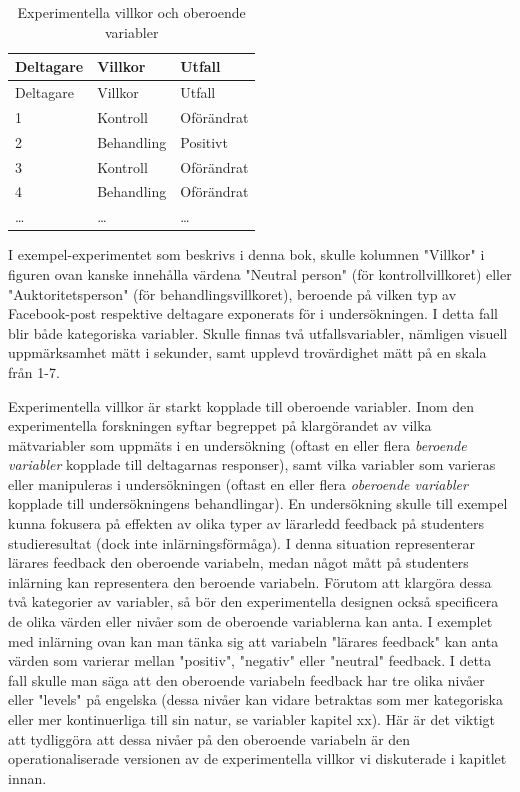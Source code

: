 \documentclass[
]{book}
\begin{document}
\begin{longtable}[]{@{}lll@{}}
\caption{Experimentella villkor och oberoende variabler}\tabularnewline
\toprule
Deltagare & Villkor & Utfall\tabularnewline
\midrule
\endfirsthead
\toprule
Deltagare & Villkor & Utfall\tabularnewline
\midrule
\endhead
1 & Kontroll & Oförändrat\tabularnewline
2 & Behandling & Positivt\tabularnewline
3 & Kontroll & Oförändrat\tabularnewline
4 & Behandling & Oförändrat\tabularnewline
\ldots{} & \ldots{} & \ldots{}\tabularnewline
\bottomrule
\end{longtable}

I exempel-experimentet som beskrivs i denna bok, skulle kolumnen "Villkor" i figuren ovan kanske innehålla värdena "Neutral person" (för kontrollvillkoret) eller "Auktoritetsperson" (för behandlingsvillkoret), beroende på vilken typ av Facebook-post respektive deltagare exponerats för i undersökningen. I detta fall blir både kategoriska variabler. Skulle finnas två utfallsvariabler, nämligen visuell uppmärksamhet mätt i sekunder, samt upplevd trovärdighet mätt på en skala från 1-7.

Experimentella villkor är starkt kopplade till oberoende variabler. Inom den experimentella forskningen syftar begreppet på klargörandet av vilka mätvariabler som uppmäts i en undersökning (oftast en eller flera \emph{beroende variabler} kopplade till deltagarnas responser), samt vilka variabler som varieras eller manipuleras i undersökningen (oftast en eller flera \emph{oberoende variabler} kopplade till undersökningens behandlingar). En undersökning skulle till exempel kunna fokusera på effekten av olika typer av lärarledd feedback på studenters studieresultat (dock inte inlärningsförmåga). I denna situation representerar lärares feedback den oberoende variabeln, medan något mått på studenters inlärning kan representera den beroende variabeln. Förutom att klargöra dessa två kategorier av variabler, så bör den experimentella designen också specificera de olika värden eller nivåer som de oberoende variablerna kan anta. I exemplet med inlärning ovan kan man tänka sig att variabeln "lärares feedback" kan anta värden som varierar mellan "positiv", "negativ" eller "neutral" feedback. I detta fall skulle man säga att den oberoende variabeln feedback har tre olika nivåer eller "levels" på engelska (dessa nivåer kan vidare betraktas som mer kategoriska eller mer kontinuerliga till sin natur, se variabler kapitel xx). Här är det viktigt att tydliggöra att dessa nivåer på den oberoende variabeln är den operationaliserade versionen av de experimentella villkor vi diskuterade i kapitlet innan.
\end{document}
